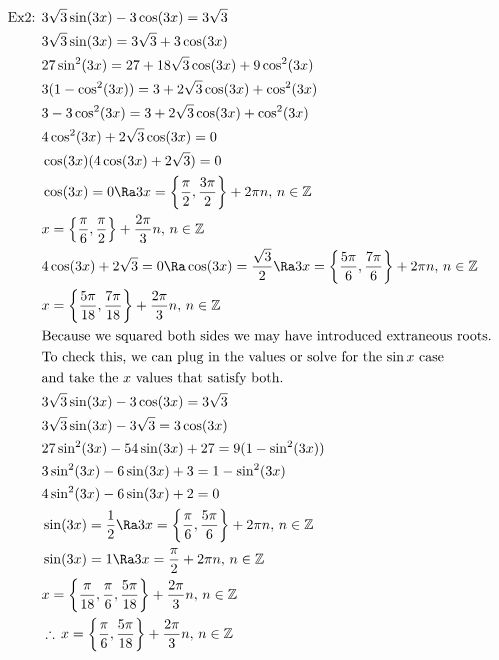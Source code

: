 \begin{align*}
    \text{Ex2: }&3\sqrt{3}\sin(3x)-3\cos(3x)=3\sqrt{3}\\
    &3\sqrt{3}\sin(3x)=3\sqrt{3}+3\cos(3x)\\
    &27\sin^2(3x)=27+18\sqrt{3}\cos(3x)+9\cos^2(3x)\\
    &3(1-\cos^2(3x))=3+2\sqrt{3}\cos(3x)+\cos^2(3x)\\
    &3-3\cos^2(3x)=3+2\sqrt{3}\cos(3x)+\cos^2(3x)\\
    &4\cos^2(3x)+2\sqrt{3}\cos(3x)=0\\
    &\cos(3x)(4\cos(3x)+2\sqrt{3})=0\\
    &\cos(3x)=0\Ra3x=\left\{\frac{\pi}{2},\frac{3\pi}{2}\right\}+2\pi n,\,n\in\mathbb{Z}\\
    &x=\left\{\frac{\pi}{6},\frac{\pi}{2}\right\}+\frac{2\pi}{3}n,\,n\in\mathbb{Z}\\
    &4\cos(3x)+2\sqrt{3}=0\Ra\cos(3x)=\frac{\sqrt{3}}{2}\Ra3x=\left\{\frac{5\pi}{6},\frac{7\pi}{6}\right\}+2\pi n,\,n\in\mathbb{Z}\\
    &x=\left\{\frac{5\pi}{18},\frac{7\pi}{18}\right\}+\frac{2\pi}{3}n,\,n\in\mathbb{Z}\\
    &\text{Because we squared both sides we may have introduced extraneous roots.}\\
    &\text{To check this, we can plug in the values or solve for the $\sin x$ case}\\
    &\text{and take the $x$ values that satisfy both.}\\
    &3\sqrt{3}\sin(3x)-3\cos(3x)=3\sqrt{3}\\
    &3\sqrt{3}\sin(3x)-3\sqrt{3}=3\cos(3x)\\
    &27\sin^2(3x)-54\sin(3x)+27=9(1-\sin^2(3x))\\
    &3\sin^2(3x)-6\sin(3x)+3=1-\sin^2(3x)\\
    &4\sin^2(3x)-6\sin(3x)+2=0\\
    &\sin(3x)=\frac{1}{2}\Ra3x=\left\{\frac{\pi}{6},\frac{5\pi}{6}\right\}+2\pi n,\,n\in\mathbb{Z}\\
    &\sin(3x)=1\Ra3x=\frac{\pi}{2}+2\pi n,\,n\in\mathbb{Z}\\
    &x=\left\{\frac{\pi}{18},\frac{\pi}{6},\frac{5\pi}{18}\right\}+\frac{2\pi}{3}n,\,n\in\mathbb{Z}\\
    &\therefore\,x=\left\{\frac{\pi}{6},\frac{5\pi}{18}\right\}+\frac{2\pi}{3}n,\,n\in\mathbb{Z}
\end{align*}
